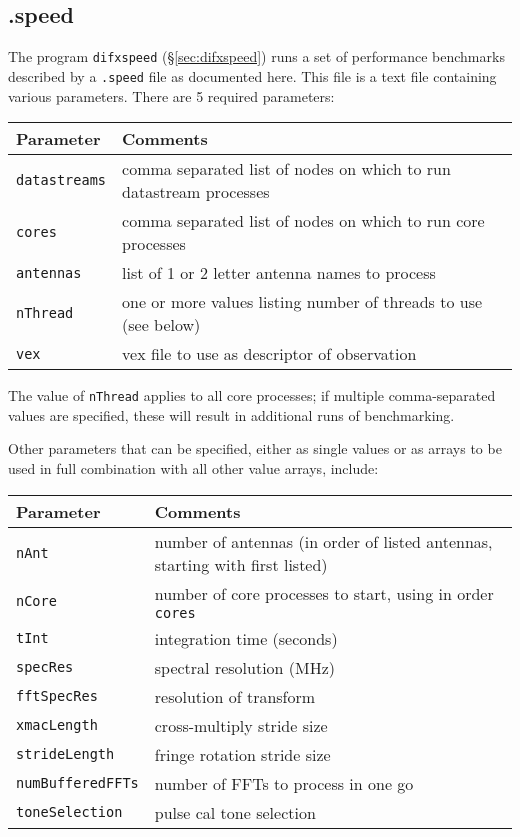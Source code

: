 
\subsection{.speed} \label{sec:speed}

The program {\tt difxspeed} (\S\ref{sec:difxspeed}) runs a set of performance benchmarks described by a {\tt .speed} file as documented here.
This file is a text file containing various parameters.
There are 5 required parameters:
\begin{center}
\begin{tabular}{ll}
\hline
Parameter & Comments \\
\hline
{\tt datastreams} & comma separated list of nodes on which to run datastream processes  \\
{\tt cores} & comma separated list of nodes on which to run core processes \\
{\tt antennas} & list of 1 or 2 letter antenna names to process \\
{\tt nThread} & one or more values listing number of threads to use (see below) \\
{\tt vex} & vex file to use as descriptor of observation \\
\hline
\end{tabular}
\end{center}

The value of {\tt nThread} applies to all core processes; if multiple comma-separated values are specified, these will result in additional runs of benchmarking.

Other parameters that can be specified, either as single values or as arrays to be used in full combination with all other value arrays, include:

\begin{center}
\begin{tabular}{ll}
\hline
Parameter & Comments \\
\hline
{\tt nAnt} & number of antennas (in order of listed antennas, starting with first listed) \\
{\tt nCore} & number of core processes to start, using in order {\tt cores} \\
{\tt tInt} & integration time (seconds) \\
{\tt specRes} & spectral resolution (MHz) \\
{\tt fftSpecRes} & resolution of transform \\
{\tt xmacLength} & cross-multiply stride size \\
{\tt strideLength} & fringe rotation stride size \\
{\tt numBufferedFFTs} & number of FFTs to process in one go \\
{\tt toneSelection} & pulse cal tone selection \\
\hline
\end{tabular}
\end{center}

